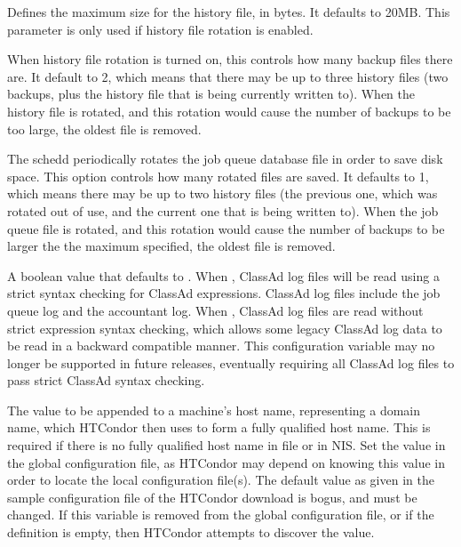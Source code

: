 \begin{description}
\label{param:MaxHistoryLog}
\item[\Macro{MAX\_HISTORY\_LOG}]
  Defines the maximum size for the history file, in bytes. It defaults
  to 20MB. This parameter is only used if history file rotation is
  enabled. 

\label{param:MaxHistoryRotations}
\item[\Macro{MAX\_HISTORY\_ROTATIONS}]
  When history file rotation is turned on, this controls how many
  backup files there are. It default to 2, which means that there may
  be up to three history files (two backups, plus the history file
  that is being currently written to). When the history file is
  rotated, and this rotation would cause the number of backups to be
  too large, the oldest file is removed. 

\label{param:MaxJobQueueLogRotations}
\item[\Macro{MAX\_JOB\_QUEUE\_LOG\_ROTATIONS}]
  The schedd periodically rotates the job queue database file in order
  to save disk space.  This option controls how many rotated files are
  saved.  It defaults to 1, which means there may be up to two history
  files (the previous one, which was rotated out of use, and the current one
  that is being written to).  When the job queue file is rotated,
  and this rotation would cause the number of backups to be larger
  the the maximum specified, the oldest file is removed.

\label{param:ClassadLogStrictParsing}
\item[\Macro{CLASSAD\_LOG\_STRICT\_PARSING}]
  A boolean value that defaults to . 
  When , ClassAd log files will be read using 
  a strict syntax checking for ClassAd expressions.  
  ClassAd log files include the job queue log and the accountant log.
  When , 
  ClassAd log files are read without strict expression syntax checking, 
  which allows some legacy ClassAd log data to be read in a backward
  compatible manner.  
  This configuration variable may no longer be supported in future releases, 
  eventually requiring all ClassAd log files to pass strict 
  ClassAd syntax checking. 

\label{param:DefaultDomainName}
\item[\Macro{DEFAULT\_DOMAIN\_NAME}]
  The value to be appended to a machine's host name,
  representing a domain name, which HTCondor then uses
  to form a fully qualified host name.
  This is required if there is no fully qualified host name 
  in file  or in NIS.
  Set the value in the global configuration file,
  as HTCondor may depend on knowing this value in order to locate
  the local configuration file(s).
  The default value as given in the sample configuration file of
  the HTCondor download is bogus, and must be changed.
  If this variable is removed from the global configuration file,
  or if the definition is empty, then HTCondor attempts to discover
  the value.


\end{description}
